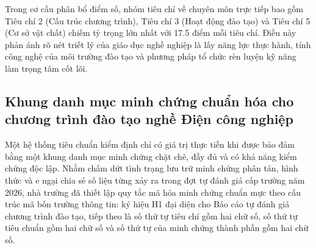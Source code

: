 Trong cơ cấu phân bổ điểm số, nhóm tiêu chí về chuyên môn trực tiếp bao gồm Tiêu chí 2 (Cấu trúc chương trình), Tiêu chí 3 (Hoạt động đào tạo) và Tiêu chí 5 (Cơ sở vật chất) chiếm tỷ trọng lớn nhất với 17.5 điểm mỗi tiêu chí. Điều này phản ánh rõ nét triết lý của giáo dục nghề nghiệp là lấy năng lực thực hành, tính công nghệ của môi trường đào tạo và phương pháp tổ chức rèn luyện kỹ năng làm trọng tâm cốt lõi.

\subsection{Khung danh mục minh chứng chuẩn hóa cho chương trình đào tạo nghề Điện công nghiệp}

Một hệ thống tiêu chuẩn kiểm định chỉ có giá trị thực tiễn khi được bảo đảm bằng một khung danh mục minh chứng chặt chẽ, đầy đủ và có khả năng kiểm chứng độc lập. Nhằm chấm dứt tình trạng lưu trữ minh chứng phân tán, hình thức và e ngại chia sẻ số liệu từng xảy ra trong đợt tự đánh giá cấp trường năm 2026, nhà trường đã thiết lập quy tắc mã hóa minh chứng chuẩn mực theo cấu trúc mã bốn trường thông tin: ký hiệu H1 đại diện cho Báo cáo tự đánh giá chương trình đào tạo, tiếp theo là số thứ tự tiêu chí gồm hai chữ số, số thứ tự tiêu chuẩn gồm hai chữ số và số thứ tự của minh chứng thành phần gồm hai chữ số.

